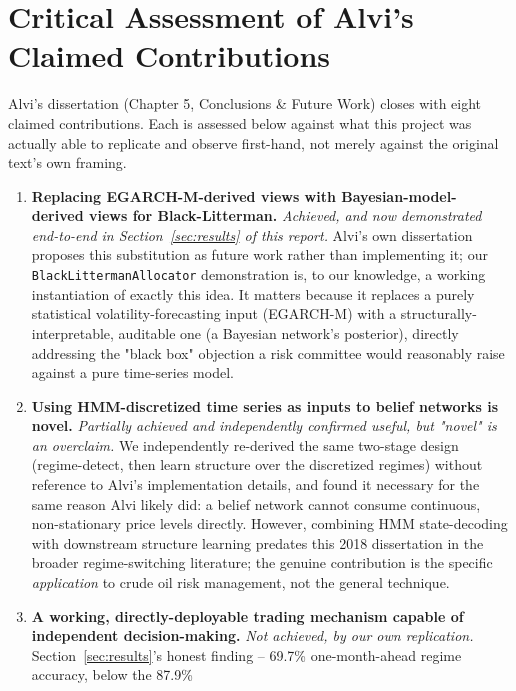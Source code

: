 \section{Critical Assessment of Alvi's Claimed Contributions}
\label{sec:alvi-critique}

Alvi's dissertation (Chapter 5, Conclusions \& Future Work)
\autocite{alvi2018pgm} closes with eight claimed contributions. Each is
assessed below against what this project was actually able to replicate
and observe first-hand, not merely against the original text's own
framing.

\begin{enumerate}
  \item \textbf{Replacing EGARCH-M-derived views with Bayesian-model-
    derived views for Black-Litterman.} \emph{Achieved, and now
    demonstrated end-to-end in Section~\ref{sec:results} of this
    report.} Alvi's own dissertation proposes this substitution as
    future work rather than implementing it; our
    \texttt{BlackLittermanAllocator} demonstration is, to our knowledge,
    a working instantiation of exactly this idea. It matters because it
    replaces a purely statistical volatility-forecasting input (EGARCH-M)
    with a structurally-interpretable, auditable one (a Bayesian
    network's posterior), directly addressing the "black box" objection
    a risk committee would reasonably raise against a pure time-series
    model.
  \item \textbf{Using HMM-discretized time series as inputs to belief
    networks is novel.} \emph{Partially achieved and independently
    confirmed useful, but "novel" is an overclaim.} We independently
    re-derived the same two-stage design (regime-detect, then learn
    structure over the discretized regimes) without reference to Alvi's
    implementation details, and found it necessary for the same reason
    Alvi likely did: a belief network cannot consume continuous,
    non-stationary price levels directly. However, combining HMM
    state-decoding with downstream structure learning predates this
    2018 dissertation in the broader regime-switching literature; the
    genuine contribution is the specific \emph{application} to crude oil
    risk management, not the general technique.
  \item \textbf{A working, directly-deployable trading mechanism capable
    of independent decision-making.} \emph{Not achieved, by our own
    replication.} Section~\ref{sec:results}'s honest finding --
    69.7\% one-month-ahead regime accuracy, below the 87.9\%

\end{enumerate}
